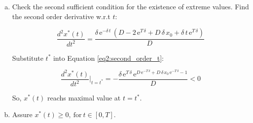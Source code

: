 \begin{enumerate}[a)]
    Under the condition below: 

    \begin{equation}\label{conditions:model2}
        \begin{split}
            \frac{e^{\delta T}}{D}-1\leq b\\
            D\leq 1\\
            D+D\,\delta \,x_{0}<{\mathrm{e}}^{T\,\delta }\\
            \text{all parameters are large than 0}
        \end{split}
    \end{equation}

    We can find the stationary point:

    \begin{equation}\label{eq2:t^*}
        t^*=-\frac{{\mathrm{e}}^{-T\,\delta }\,\left(D-{\mathrm{e}}^{T\,\delta }+D\,\delta \,x_{0}\right)}{\delta }
    \end{equation}

    Obviously, $\frac{dx^*(t)}{dt}<0\ \text{for}\ t\in [0,t^*)$ and $\frac{dx^*(t)}{dt}\geq 0\ \text{for}\ t\in [t^*,T]$.
    
    So, $x^*(t)$ reachs maximal value at $t=t^*$.

    \item Check the second sufficient condition for the existence of extreme values. Find the second order derivative w.r.t $t$: 

    \begin{equation}\label{eq2:second_order_t}
        \frac{d^2x^*(t)}{dt^2}=\frac{\delta \,{\mathrm{e}}^{-\delta \,t}\,\left(D-2\,{\mathrm{e}}^{T\,\delta }+D\,\delta \,x_{0}+\delta \,t\,{\mathrm{e}}^{T\,\delta }\right)}{D}
    \end{equation}

    Substitute $t^*$ into Equation \eqref{eq2:second_order_t}:
    
    \begin{equation}
        \frac{d^2x^*(t)}{dt^2}\bigg|_{t=t^*}=-\frac{\delta \,{\mathrm{e}}^{T\,\delta }\,{\mathrm{e}}^{D\,{\mathrm{e}}^{-T\,\delta }+D\,\delta \,x_{0}\,{\mathrm{e}}^{-T\,\delta }-1}}{D}<0
    \end{equation}

    So, $x^*(t)$ reachs maximal value at $t=t^*$.

    \item Assure $x^*(t)\geq 0,\ \text{for}\ t\in[0,T]$.
    


\end{enumerate}
